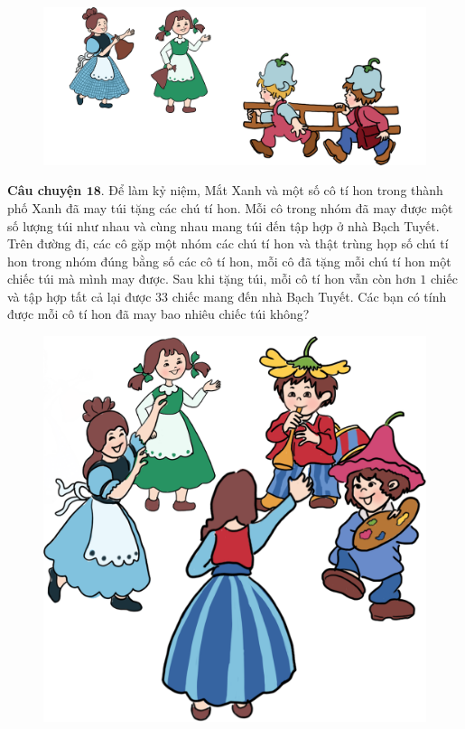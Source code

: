 	\begin{figure}
		\centering
		\vspace*{5pt}
		\captionsetup{labelformat= empty, justification=centering}
		\includegraphics[width=1\linewidth]{Hinh20_TangTui}
		\vspace*{-10pt}
	\end{figure}
	\textbf{\color{toancuabi}Câu chuyện $\pmb{18.}$} Để làm kỷ niệm, Mắt Xanh và một số cô tí hon trong thành phố Xanh đã may túi tặng các chú tí hon. Mỗi cô trong nhóm đã may được một số lượng túi như nhau và cùng nhau mang túi đến tập hợp ở nhà Bạch Tuyết. Trên đường đi, các cô gặp một nhóm các chú tí hon và thật trùng họp số chú tí hon trong nhóm đúng bằng số các cô tí hon, mỗi cô đã tặng mỗi chú tí hon một chiếc túi mà mình may được. Sau khi tặng túi, mỗi cô tí hon vẫn còn hơn $1$ chiếc và tập hợp tất cả lại được $33$ chiếc mang đến nhà Bạch Tuyết. Các bạn có tính được mỗi cô tí hon đã may bao nhiêu chiếc túi không?
	\vskip 0.1cm
	\begin{figure}
		\centering
		\vspace*{-5pt}
		\captionsetup{labelformat= empty, justification=centering}
		\includegraphics[width=1\linewidth]{Hinh21_VongTron}
		\vspace*{-15pt}
	\end{figure}	
